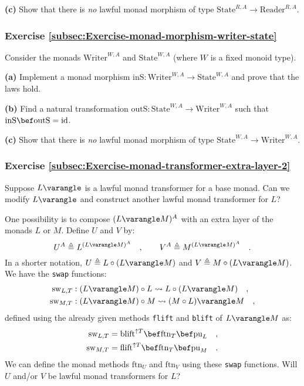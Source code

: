 \textbf{(c)} Show that there is \emph{no} lawful monad morphism of
type $\text{State}^{R,A}\rightarrow\text{Reader}^{R,A}$.

\subsubsection{Exercise \label{subsec:Exercise-monad-morphism-writer-state}\ref{subsec:Exercise-monad-morphism-writer-state}}

Consider the monads $\text{Writer}^{W,A}$ and $\text{State}^{W,A}$
(where $W$ is a fixed monoid type).

\textbf{(a)} Implement a monad morphism $\text{inS}:\text{Writer}^{W,A}\rightarrow\text{State}^{W,A}$
and prove that the laws hold.

\textbf{(b)} Find a natural transformation $\text{outS}:\text{State}^{W,A}\rightarrow\text{Writer}^{W,A}$
such that $\text{inS}\bef\text{outS}=\text{id}$.

\textbf{(c)} Show that there is \emph{no} lawful monad morphism of
type $\text{State}^{W,A}\rightarrow\text{Writer}^{W,A}$.

\subsubsection{Exercise \label{subsec:Exercise-monad-transformer-extra-layer-2}\ref{subsec:Exercise-monad-transformer-extra-layer-2} }

Suppose $L\varangle$ is a lawful monad transformer for a base monad.
Can we modify $L\varangle$ and construct another lawful monad transformer
for $L$?

One possibility is to compose $(L\varangle M)^{A}$ with an extra
layer of the monads $L$ or $M$. Define $U$ and $V$ by:
\[
U^{A}\triangleq L^{(L\varangle M)^{A}}\quad,\quad\quad V^{A}\triangleq M^{(L\varangle M)^{A}}\quad.
\]
In a shorter notation, $U\triangleq L\circ(L\varangle M)$ and $V\triangleq M\circ(L\varangle M)$.
We have the \lstinline!swap! functions:
\begin{align*}
\text{sw}_{L,T} & :(L\varangle M)\circ L\leadsto L\circ(L\varangle M)\quad,\\
\text{sw}_{M,T} & :(L\varangle M)\circ M\leadsto(M\circ L)\varangle M\quad,
\end{align*}
defined using the already given methods \lstinline!flift! and \lstinline!blift!
of $L\varangle M$ as:
\begin{align*}
\text{sw}_{L,T} & =\text{blift}^{\uparrow T}\bef\text{ftn}_{T}\bef\text{pu}_{L}\quad,\\
\text{sw}_{M,T} & =\text{flift}^{\uparrow T}\bef\text{ftn}_{T}\bef\text{pu}_{M}\quad.
\end{align*}
We can define the monad methods $\text{ftn}_{U}$ and $\text{ftn}_{V}$
using these \lstinline!swap! functions. Will $U$ and/or $V$ be
lawful monad transformers for $L$? 

